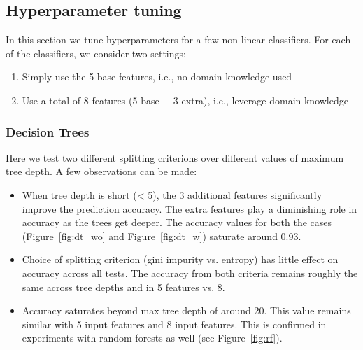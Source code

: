 \documentclass{article}
\begin{document}
\subsection{Hyperparameter tuning}
\label{sec:tuning}
In this section we tune hyperparameters for a few non-linear classifiers. For each of the classifiers, we consider two settings:
\begin{enumerate} 
\item Simply use the 5 base features, i.e., no domain knowledge used
\item Use a total of 8 features (5 base + 3 extra), i.e., leverage domain knowledge
\end{enumerate}

\subsubsection{Decision Trees}
Here we test two different splitting criterions over different values of maximum tree depth. A few observations can be made:
\begin{itemize}
\item When tree depth is short (< 5), the 3 additional features significantly improve the prediction accuracy. The extra features play a diminishing role in accuracy as the trees get deeper. The accuracy values for both the cases (Figure~\ref{fig:dt_wo} and Figure~\ref{fig:dt_w}) saturate around 0.93.
\item Choice of splitting criterion (gini impurity vs. entropy) has little effect on accuracy across all tests. The accuracy from both criteria remains roughly the same across tree depths and in 5 features vs. 8.
\item Accuracy saturates beyond max tree depth of around 20. This value remains similar with 5 input features and 8 input features. This is confirmed in experiments with random forests as well (see Figure~\ref{fig:rf}).
\end{itemize}
\end{document}
